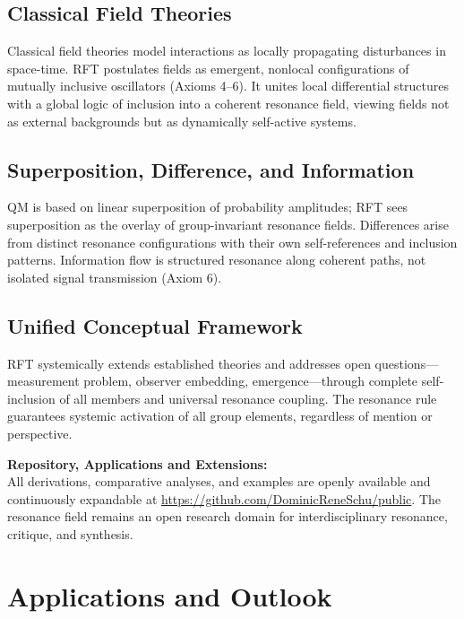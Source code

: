 \documentclass[12pt]{iopart}
\begin{document}
\subsection{Classical Field Theories}

Classical field theories model interactions as locally propagating disturbances in space-time. RFT postulates fields as emergent, nonlocal configurations of mutually inclusive oscillators (Axioms 4–6). It unites local differential structures with a global logic of inclusion into a coherent resonance field, viewing fields not as external backgrounds but as dynamically self-active systems.

\subsection{Superposition, Difference, and Information}

QM is based on linear superposition of probability amplitudes; RFT sees superposition as the overlay of group-invariant resonance fields. Differences arise from distinct resonance configurations with their own self-references and inclusion patterns. Information flow is structured resonance along coherent paths, not isolated signal transmission (Axiom 6).

\subsection{Unified Conceptual Framework}

RFT systemically extends established theories and addresses open questions—measurement problem, observer embedding, emergence—through complete self-inclusion of all members and universal resonance coupling. The resonance rule guarantees systemic activation of all group elements, regardless of mention or perspective.

\medskip

\noindent\textbf{Repository, Applications and Extensions:}\\
All derivations, comparative analyses, and examples are openly available and continuously expandable at  
\url{https://github.com/DominicReneSchu/public}.  
The resonance field remains an open research domain for interdisciplinary resonance, critique, and synthesis.


\section{Applications and Outlook}
\end{document}
